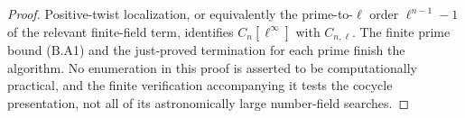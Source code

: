 \begin{proof}
Positive-twist localization, or equivalently the prime-to-\(\ell\)
order \(\ell^{n-1}-1\) of the relevant finite-field term, identifies
\(C_n[\ell^\infty]\) with \(C_{n,\ell}\).  The finite prime
bound (B.A1) and the just-proved termination for each prime finish
the algorithm.  No enumeration in this proof is asserted to be
computationally practical, and the finite verification accompanying
it tests the cocycle presentation, not all of its astronomically
large number-field searches.
\end{proof}

